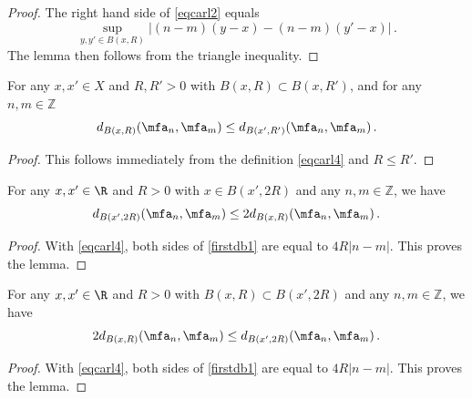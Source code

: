 \begin{proof}
\leanok
    The right hand side of \eqref{eqcarl2} equals
    $$
        \sup_{y,y'\in B(x,R)}|(n-m)(y-x)-(n-m)(y'-x)|\,.
    $$
    The lemma then follows from the triangle inequality.
\end{proof}

\begin{lemma}
\label{frequency-monotone}
\leanok

    For any $x, x' \in X$ and $R, R' > 0$ with $B(x,R) \subset B(x, R')$, and for any $n, m \in \mathbb{Z}$
    $$
        d_{B(x,R)}(\mfa_n, \mfa_m) \le d_{B(x',R')}(\mfa_n, \mfa_m)\,.
    $$
\end{lemma}

\begin{proof}
\leanok
    This follows immediately from the definition \eqref{eqcarl4} and $R \le R'$.
\end{proof}

\begin{lemma}
\label{frequency-ball-doubling}
\leanok
{}
  For any $x,x'\in \R$ and $R>0$ with
   $x\in B(x',2R)$ and any $n,m\in \mathbb{Z}$, we have
\begin{equation}\label{firstdb1}
    d_{B(x',2R)}(\mfa_n,\mfa_m)\le 2 d_{B(x,R)}(\mfa_n,\mfa_m) \, .
\end{equation}
\end{lemma}

\begin{proof}
\leanok
With \eqref{eqcarl4}, both sides of \eqref{firstdb1} are equal to $4R|n-m|$. This proves the lemma.
\end{proof}

\begin{lemma}
\label{frequency-ball-growth}
\leanok
    For any $x,x'\in \R$ and $R>0$ with
   $B(x,R)\subset B(x',2R)$ and any $n,m\in \mathbb{Z}$, we have
\begin{equation}\label{seconddb1}
    2d_{B(x,R)}(\mfa_n,\mfa_m)\le d_{B(x',2R)}(\mfa_n,\mfa_m) \, .
\end{equation}
\end{lemma}

\begin{proof}
\leanok
    With \eqref{eqcarl4}, both sides of \eqref{firstdb1} are equal to $4R|n-m|$. This proves the lemma.
\end{proof}

